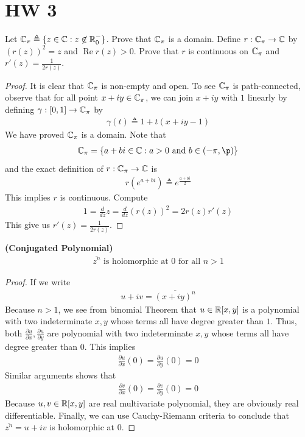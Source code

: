 \documentclass{report}
\begin{document}
\section{HW 3}
\begin{question}{}{}
Let $\mathbb{C}_{\pi}\triangleq \{ z\in\mathbb{C}:z\not\in\mathbb{R}^-_0 \}$. Prove that $\mathbb{C}_\pi$ is a domain. Define $r:\mathbb{C}_\pi\rightarrow \mathbb{C}$ by  $(r(z))^2=z$ and $\operatorname{Re}r(z)>0$. Prove that $r$ is continuous on $\mathbb{C}_\pi$ and $r'(z)=\frac{1}{2r(z)}$. 
\end{question}
\begin{proof}
It is clear that $\mathbb{C}_\pi$ is non-empty and open. To see $\mathbb{C}_\pi$ is path-connected, observe that for all point $x+iy \in\mathbb{C}_\pi$, we can join $x+iy$ with  $1$ linearly by defining $\gamma :[0,1]\rightarrow \mathbb{C}_\pi$ by  
\begin{align*}
\gamma (t)\triangleq 1+t(x+iy-1)
\end{align*}
We have proved $\mathbb{C}_\pi$ is a domain. Note that 
\begin{align*}
\C_\pi=\set{a+b i\inc: a>0\text{ and }b \in (-\pi, \p)}
\end{align*}
and the exact definition of $r:\mathbb{C}_\pi\rightarrow \mathbb{C}$ is 
\begin{align*}
r(e^{a+b i})\triangleq e^{\frac{a+b i}{2}}
\end{align*}
This implies $r$ is continuous. Compute
 \begin{align*}
1=\frac{d}{dz}z= \frac{d}{dz}(r(z))^2=2r(z)r'(z)
\end{align*}
This give us $r'(z)=\frac{1}{2 r(z)}$. 
\end{proof}
\begin{theorem}
\label{CP}
\textbf{(Conjugated Polynomial)} 
\begin{align*}
\overline{z^n}\text{ is holomorphic at $0$ for all }n>1
\end{align*}
\end{theorem}
\begin{proof}
If we write 
\begin{align*}
u+iv=\overline{(x+iy)^n}
\end{align*}
Because $n>1$, we see from binomial Theorem that $u \in \mathbb{R}[x,y]$ is a polynomial with two indeterminate $x,y$ whose terms all have degree greater than $1$. Thus, both  $\frac{\partial u}{\partial x},\frac{\partial u}{\partial y}$ are polynomial with two indeterminate $x,y$ whose terms all have degree greater than  $0$. This implies 
\begin{align*}
\frac{\partial u}{\partial x}(0)=\frac{\partial u}{\partial  y}(0)=0
\end{align*}
Similar arguments shows that 
\begin{align*}
\frac{\partial v}{\partial x}(0)=\frac{\partial v}{\partial y}(0)=0
\end{align*}
Because $u,v\in\mathbb{R}[x,y]$ are real multivariate polynomial, they are obviously real differentiable. Finally, we can use Cauchy-Riemann criteria to conclude that $\overline{z^n}=u+iv$ is holomorphic at $0$.
\end{proof}
\end{document}
